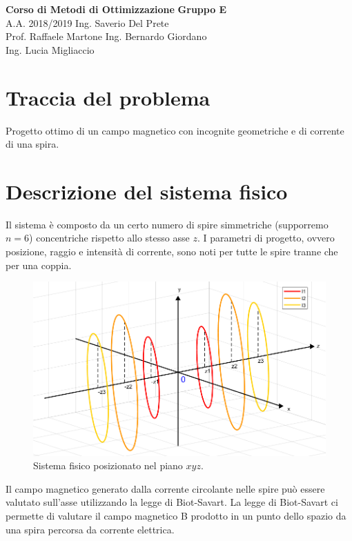 \documentclass[a4paper, 11pt]{article}
\begin{document}
\noindent
\large\textbf{Corso di Metodi di Ottimizzazione} \hfill \textbf{Gruppo E} \\
\normalsize A.A. 2018/2019 \hfill Ing. Saverio Del Prete \\
Prof. Raffaele Martone \hfill Ing. Bernardo Giordano \\
\hphantom{}\hfill Ing. Lucia Migliaccio

\section*{Traccia del problema}

Progetto ottimo di un campo magnetico con incognite geometriche e di corrente di
una spira.

\section*{Descrizione del sistema fisico}

Il sistema è composto da un certo numero di spire simmetriche (supporremo $n=6$)
concentriche rispetto allo stesso asse $z$. I parametri di progetto, ovvero
posizione, raggio e intensità di corrente, sono noti per tutte le spire tranne
che per una coppia.

\begin{figure}[H]
	\centering
	\includegraphics[width=12cm]{assets/figure1}
	\caption{Sistema fisico posizionato nel piano $xyz$.}
\end{figure}

\noindent
Il campo magnetico generato dalla corrente circolante nelle spire può essere
valutato sull’asse utilizzando la legge di Biot-Savart. La legge di Biot-Savart
ci permette di valutare il campo magnetico B prodotto in un punto dello spazio
da una spira percorsa da corrente elettrica.
\end{document}
